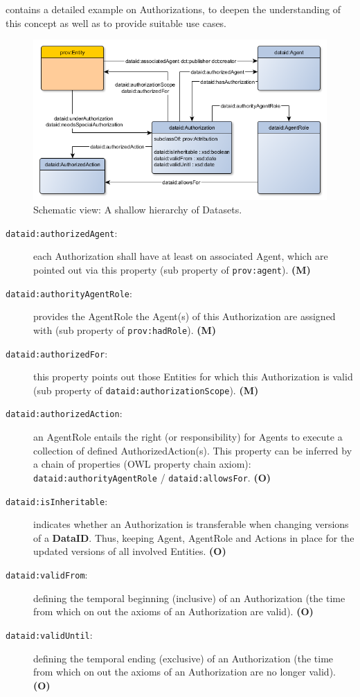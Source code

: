 \documentclass[a4paper,english,twoside,BCOR1.5cm,headsepline,DIV12,appendixprefix,final,12pt]{scrbook}
\newcommand{\dataid}{{\ttfamily\bfseries DataID}\xspace}
\newcommand{\prop}[1]{{{\texttt{#1}}}}
\begin{document}
 contains a detailed example on Authorizations, to deepen the understanding of this concept as well as to provide suitable use cases.

\begin{figure}[!htbp]
\centering
  \includegraphics[width=\textwidth]{images/ClassAuthorization.png}
  \caption{Schematic view: A shallow hierarchy of Datasets.}
  \label{fig:example}
\end{figure}

\begin{description}
\item[\prop{dataid:authorizedAgent}:] each Authorization shall have at least on associated Agent, which are pointed out via this property (sub property of \prop{prov:agent}). \textbf{(M)}
\item[\prop{dataid:authorityAgentRole}:] provides the AgentRole the Agent(s) of this Authorization are assigned with (sub property of \prop{prov:hadRole}). \textbf{(M)}
\item[\prop{dataid:authorizedFor}:] this property points out those Entities for which this Authorization is valid (sub property of \prop{dataid:authorizationScope}). \textbf{(M)}
\item[\prop{dataid:authorizedAction}:] an AgentRole entails the right (or responsibility) for Agents to execute a collection of defined AuthorizedAction(s). This property can be inferred by a chain of properties (OWL property chain axiom): \prop{dataid:authorityAgentRole} / \prop{dataid:allowsFor}. \textbf{(O)}
\item[\prop{dataid:isInheritable}:] indicates whether an Authorization is transferable when changing versions of a \dataid. Thus, keeping Agent, AgentRole and Actions in place for the updated versions of all involved Entities. \textbf{(O)}
\item[\prop{dataid:validFrom}:] defining the temporal beginning (inclusive) of an Authorization (the time from which on out the axioms of an Authorization are valid). \textbf{(O)}
\item[\prop{dataid:validUntil}:] defining the temporal ending (exclusive) of an Authorization (the time from which on out the axioms of an Authorization are no longer valid). \textbf{(O)}
\end{description}
\end{document}
